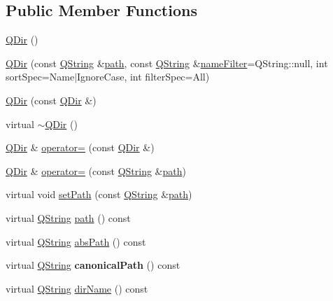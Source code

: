 \subsection*{Public Member Functions}
\begin{DoxyCompactItemize}
\item 
\mbox{\hyperlink{class_q_dir_a78cf34af6b7e0ffa3d11ef0ba0ecd403}{Q\+Dir}} ()
\item 
\mbox{\hyperlink{class_q_dir_ad4f09eb0858b034f2b2edff184e1f50d}{Q\+Dir}} (const \mbox{\hyperlink{class_q_string}{Q\+String}} \&\mbox{\hyperlink{class_q_dir_a6258e0803c991909e0ce38e40f6f07ec}{path}}, const \mbox{\hyperlink{class_q_string}{Q\+String}} \&\mbox{\hyperlink{class_q_dir_a6d71d046861c1728359a6119a1250a74}{name\+Filter}}=Q\+String\+::null, int sort\+Spec=Name$\vert$Ignore\+Case, int filter\+Spec=All)
\item 
\mbox{\hyperlink{class_q_dir_a16e6aedc84e9e1a5c10ded811b6510b3}{Q\+Dir}} (const \mbox{\hyperlink{class_q_dir}{Q\+Dir}} \&)
\item 
virtual \mbox{\hyperlink{class_q_dir_a1f28124d07dac6de42de73f074e7dbec}{$\sim$\+Q\+Dir}} ()
\item 
\mbox{\hyperlink{class_q_dir}{Q\+Dir}} \& \mbox{\hyperlink{class_q_dir_a3be7ccbacac7fa0e2fd2143259d0e04b}{operator=}} (const \mbox{\hyperlink{class_q_dir}{Q\+Dir}} \&)
\item 
\mbox{\hyperlink{class_q_dir}{Q\+Dir}} \& \mbox{\hyperlink{class_q_dir_a157b465ee1cb0ab76947e6f9d07f8715}{operator=}} (const \mbox{\hyperlink{class_q_string}{Q\+String}} \&\mbox{\hyperlink{class_q_dir_a6258e0803c991909e0ce38e40f6f07ec}{path}})
\item 
virtual void \mbox{\hyperlink{class_q_dir_ac947989c99aecbfebd509088b8834715}{set\+Path}} (const \mbox{\hyperlink{class_q_string}{Q\+String}} \&\mbox{\hyperlink{class_q_dir_a6258e0803c991909e0ce38e40f6f07ec}{path}})
\item 
virtual \mbox{\hyperlink{class_q_string}{Q\+String}} \mbox{\hyperlink{class_q_dir_a6258e0803c991909e0ce38e40f6f07ec}{path}} () const
\item 
virtual \mbox{\hyperlink{class_q_string}{Q\+String}} \mbox{\hyperlink{class_q_dir_a1464e556606a3223b8db1b3629c41cb7}{abs\+Path}} () const
\item 
\mbox{\label{class_q_dir_a77406c9757ae161332c2dc1640f0be64}} 
virtual \mbox{\hyperlink{class_q_string}{Q\+String}} {\bfseries canonical\+Path} () const
\item 
virtual \mbox{\hyperlink{class_q_string}{Q\+String}} \mbox{\hyperlink{class_q_dir_a2c904d64a7194a57ee583d111cbbdeff}{dir\+Name}} () const

\end{DoxyCompactItemize}
